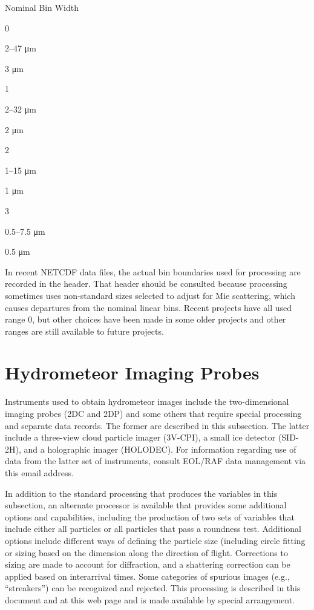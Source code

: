 \documentclass[
  english,
]{book}
\begin{document}
Nominal Bin Width

0

2--47 {μm}

3 {μm}

1

2--32 {μm}

2 {μm}

2

1--15 {μm}

1 {μm}

3

0.5--7.5 {μm}

0.5 {μm}

In recent NETCDF data files, the actual bin boundaries used for processing are recorded in the header. That header should be consulted because processing sometimes uses non-standard sizes selected to adjust for Mie scattering, which causes departures from the nominal linear bins. Recent projects have all used range 0, but other choices have been made in some older projects and other ranges are still available to future projects.

\hypertarget{hydrometeor-imaging-probes}{%
\section{Hydrometeor Imaging Probes}\label{hydrometeor-imaging-probes}}

Instruments used to obtain hydrometeor images include the two-dimensional imaging probes (2DC and 2DP) and some others that require special processing and separate data records. The former are described in this subsection. The latter include a three-view cloud particle imager (3V-CPI), a small ice detector (SID-2H), and a holographic imager (HOLODEC). For information regarding use of data from the latter set of instruments, consult EOL/RAF data management via this email address.

In addition to the standard processing that produces the variables in this subsection, an alternate processor is available that provides some additional options and capabilities, including the production of two sets of variables that include either all particles or all particles that pass a roundness test. Additional options include different ways of defining the particle size (including circle fitting or sizing based on the dimension along the direction of flight. Corrections to sizing are made to account for diffraction, and a shattering correction can be applied based on interarrival times. Some categories of spurious images (e.g., ``streakers'') can be recognized and rejected. This processing is described in this document and at this web page and is made available by special arrangement.
\end{document}
